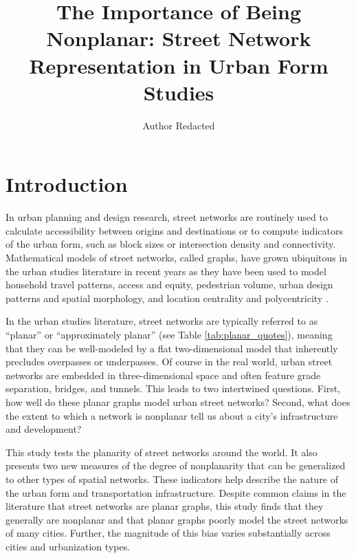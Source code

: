 \documentclass[Afour,sageh,times]{sagej}
\begin{document}
\title{The Importance of Being Nonplanar: Street Network Representation in Urban Form Studies}
\author{Author Redacted }


\begin{abstract}

\end{abstract}


\maketitle

\section{Introduction}

In urban planning and design research, street networks are routinely used to calculate accessibility between origins and destinations or to compute indicators of the urban form, such as block sizes or intersection density and connectivity. Mathematical models of street networks, called graphs, have grown ubiquitous in the urban studies literature in recent years as they have been used to model household travel patterns, access and equity, pedestrian volume, urban design patterns and spatial morphology, and location centrality and polycentricity \citep{marshall_street_2010,porta_alterations_2014,marshall_community_2014,hajrasouliha_impact_2015,parthasarathi_street_2015,knight_metrics_2015,gil_street_2016,zhong_revealing_2017}.

In the urban studies literature, street networks are typically referred to as \enquote{planar} or \enquote{approximately planar} (see Table \ref{tab:planar_quotes}), meaning that they can be well-modeled by a flat two-dimensional model that inherently precludes overpasses or underpasses. Of course in the real world, urban street networks are embedded in three-dimensional space and often feature grade separation, bridges, and tunnels. This leads to two intertwined questions. First, how well do these planar graphs model urban street networks? Second, what does the extent to which a network is nonplanar tell us about a city's infrastructure and development?

This study tests the planarity of street networks around the world. It also presents two new measures of the degree of nonplanarity that can be generalized to other types of spatial networks. These indicators help describe the nature of the urban form and transportation infrastructure. Despite common claims in the literature that street networks are planar graphs, this study finds that they generally are nonplanar and that planar graphs poorly model the street networks of many cities. Further, the magnitude of this bias varies substantially across cities and urbanization types.
\end{document}
